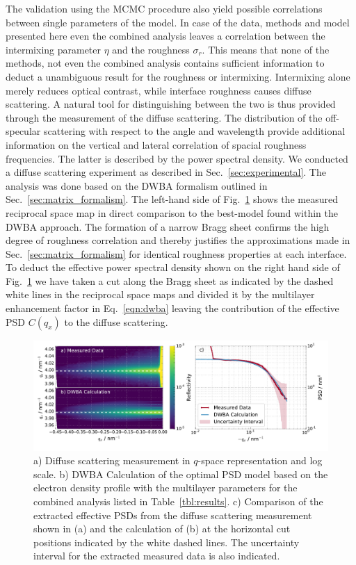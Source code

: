 The validation using the MCMC procedure also yield possible correlations between single parameters of the model. In case of the data, methods and model presented here even the combined analysis leaves a correlation between the intermixing parameter $\eta$ and the roughness $\sigma_r$. This means that none of the methods, not even the combined analysis contains sufficient information to deduct a unambiguous result for the roughness or intermixing. Intermixing alone merely reduces optical contrast, while interface roughness causes diffuse scattering. A natural tool for distinguishing between the two is thus provided through the measurement of the diffuse scattering. The distribution of the off-specular scattering with respect to the angle and wavelength provide additional information on the vertical and lateral correlation of spacial roughness frequencies. The latter is described by the power spectral density. We conducted a diffuse scattering experiment as described in Sec.~\ref{sec:experimental}. The 
analysis was done based on the DWBA formalism outlined in Sec.~\ref{sec:matrix_formalism}. The left-hand side of Fig.~\ref{fig:diffuse_meas} shows the measured reciprocal space map in direct comparison to the best-model found within the DWBA approach. The formation of a narrow Bragg sheet \cite{Haase:14,PhysRevLett.73.2228} confirms the high degree of roughness correlation and thereby justifies the approximations made in Sec.~\ref{sec:matrix_formalism} for identical roughness properties at each interface. To deduct the effective power spectral density shown on the right hand side of Fig.~\ref{fig:diffuse_meas} we have taken a cut along the Bragg sheet as indicated by the dashed white lines in the reciprocal space maps and divided it by the multilayer enhancement factor in Eq.~\ref{eqn:dwba} leaving the contribution of the effective PSD $C(q_x)$ to the diffuse scattering.
\onecolumn
\begin{figure}
  \centering
  \includegraphics[width=\textwidth]{img/im_cr_sc_multilayer/diffuse_incl_psd}
  \caption{a) Diffuse scattering measurement in $q$-space representation and log scale. b) DWBA Calculation of the optimal PSD model based on the electron density profile with the multilayer parameters for the combined analysis listed in Table~\ref{tbl:results}. c) Comparison of the extracted effective PSDs from the diffuse scattering measurement shown in (a) and the calculation of (b) at the horizontal cut positions indicated by the white dashed lines. The uncertainty interval for the extracted measured data is also indicated.}
  \label{fig:diffuse_meas}
\end{figure}

